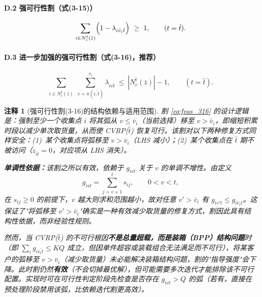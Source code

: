 \documentclass{article}
\newtheorem{remark}{注释}
\begin{document}
\paragraph{D.2 强可行性割（式(3-15)）}
\begin{equation}
\sum_{i\in N_c^{\hat t}(\bar z)}\Bigl(1-\lambda_{i\bar v_i \hat t}\Bigr)\ \ge\ 1,
\qquad (t=\hat t).
\label{eq:feas_315}
\end{equation}

\paragraph{D.3 进一步加强的强可行性割（式(3-16)，推荐）}
\begin{equation}
\sum_{i\in N_c^{\hat t}(\bar z)}\ \sum_{v=\pi(i,\hat t)}^{\bar v_i}\lambda_{iv\hat t}\ \le\ |N_c^{\hat t}(\bar z)|-1,
\qquad (t=\hat t).
\label{eq:feas_316}
\end{equation}

\begin{remark}[强可行性割(3-16)的结构依赖与适用范围]
割 \eqref{eq:feas_316} 的设计逻辑是：强制至少一个收集点 $i$ 将其弧从 $v\le\bar v_i$（当前选择）移至 $v>\bar v_i$，即缩短积累时段以减少单次取货量，从而使 CVRP($\hat t$) 恢复可行。该割对以下两种修复方式同样安全：(1)~某个收集点将弧移至 $v>\bar v_i$（LHS 减小）；(2)~某个收集点在 $\hat t$ 期不被访问（$z_{i\hat t}=0$，对应项从 LHS 消失）。

\textbf{单调性依据：}该割之所以有效，依赖于 $g_{ivt}$ 关于 $v$ 的单调不增性。由定义
\[
g_{ivt}=\sum_{j=v+1}^{t}s_{ij},\qquad 0<v<t,
\]
在 $s_{ij}\ge 0$ 的前提下，$v$ 越大则求和范围越小，故对任意 $v'>\bar v_i$ 有 $g_{iv't}\le g_{i\bar v_i t}$。这保证了"将弧移至 $v'>\bar v_i$"确实是一种有效减少取货量的修复方式，割因此具有结构性依据，而非经验性规则。

然而，当 CVRP($\hat t$) 的不可行根因\textbf{不是总量超载，而是装箱（BPP）结构问题}时（即 $\sum_{i}g_{i\bar v_i \hat t}\le KQ$ 成立，但因单件超容或装载组合无法满足而不可行），将某客户的弧移至 $v>\bar v_i$（减少取货量）未必能解决装箱结构问题，割的"指导强度"会下降。此时割仍然\textbf{有效}（不会切掉最优解），但可能需要多次迭代才能排除该不可行配置。实现时可在可行性判定阶段先检查是否存在 $g_{ivt}>Q$ 的弧（若有，直接在预处理阶段禁用该弧，比依赖迭代割更高效）。
\end{remark}

\end{document}
